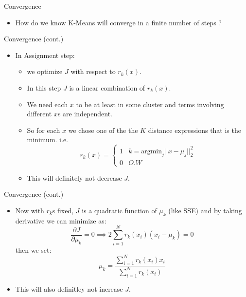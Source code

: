 \documentclass[serif, aspectratio=169]{beamer}
\begin{document}
\begin{frame}{Convergence}
    \begin{itemize}
    \item How do we know K-Means will converge in a finite number of steps ?
        
    \end{itemize}
\end{frame}

\begin{frame}{Convergence (cont.)}
\begin{itemize}
    \item  In Assignment step:
        \begin{itemize}
        \item  we optimize \( J \) with respect to \( r_k(x) \).
        \item In this step \( J \) is a linear combination of \( r_k(x) \).
        \item We need each $x$ to be at least in some cluster and terms involving different $x$s are independent.
        \item So for each $x$ we chose one of the the $K$ distance expressions that is the minimum. i.e. 
            $$
            r_k(x) = 
            \begin{cases}
                1 & k = \text{argmin}_j ||x-\mu_j ||_2^2 \\
                0 & O.W
            \end{cases}
            $$
            \item This will definitely not decrease $J$.
        \end{itemize}
            
\end{itemize}
    
\end{frame}

\begin{frame}{Convergence (cont.)}
\begin{itemize}
    \item  Now with $r_k$s fixed, $J$ is a quadratic function of $\mu_k$ (like SSE) and by taking derivative we can minimize as:
$$
        \frac{ \partial J }{ \partial \mu_k } = 0 \implies 2 \sum_{i=1}^{N} r_k(x_i) \left(x_i - \mu_k \right) = 0
$$
then we set:
$$
        \mu_k = \frac{\sum_{i=1}^{N}{r_k(x_i)x_i}}{\sum_{i=1}^{N} r_k(x_i)}
$$
\item This will also definitley not increase $J$.

\end{itemize}
    
\end{frame}
\end{document}
